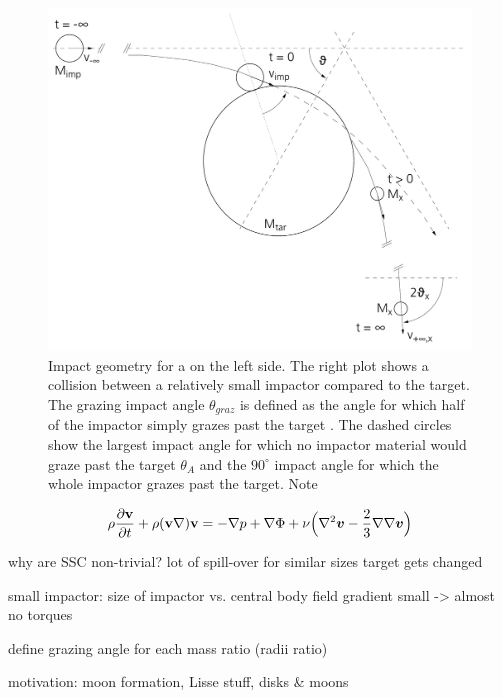 \begin{figure}[htbp]
\begin{center}
\includegraphics[scale=0.5]{04_vartheta}
\caption{Impact geometry for a \SSC on the left side. The right plot shows a collision between a relatively small impactor compared to the target. The grazing impact angle $\theta_{graz}$ is defined as the angle for which half of the impactor simply grazes past the target \citep{Asphaug:2010p3539}. The dashed circles show the largest impact angle for which no impactor material would graze past the target $\theta_A$ and the $90^\circ$ impact angle for which the whole impactor grazes past the target. Note }
\label{ch03_fig02}
\end{center}
\end{figure}


\begin{equation}
\label{ch03_fld01_eq002}
\rho \frac{\partial \mathbf{v}}{\partial t} + \rho ( \mathbf{v} \nabla ) \mathbf{v} = - \nabla p + \nabla \Phi + \nu \Big( \nabla^2 \boldsymbol{v} - \frac{2}{3} \nabla \nabla \boldsymbol{v} \Big)
\end{equation}




why are SSC non-trivial?
lot of spill-over for similar sizes
target gets changed

small impactor: size of impactor vs. central body field gradient small -> almost no torques

define grazing angle for each mass ratio (radii ratio)

motivation: moon formation, Lisse stuff, disks \& moons

